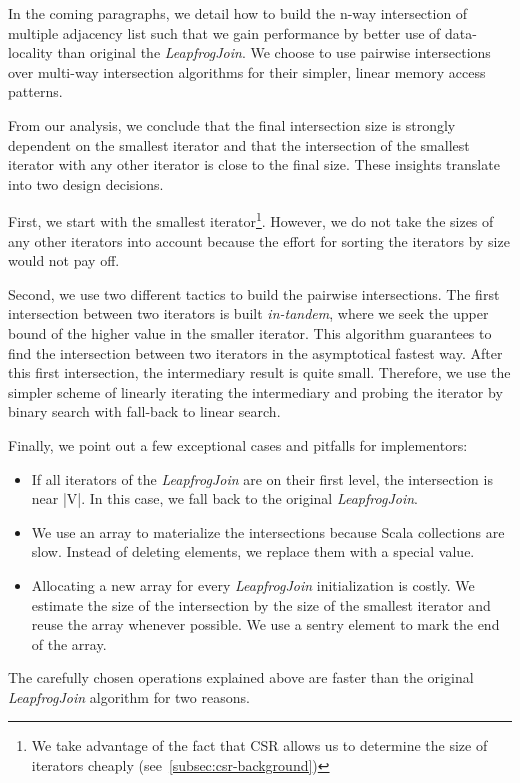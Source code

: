 In the coming paragraphs, we detail how to build the n-way intersection of multiple adjacency list
such that we gain performance by better use of data-locality than original the \textit{LeapfrogJoin}.
We choose to use pairwise intersections over multi-way intersection algorithms for their simpler,
linear memory access patterns.

From our analysis, we conclude that the final intersection size is strongly dependent on the
smallest iterator and that the intersection of the smallest iterator with any other iterator is
close to the final size.
These insights translate into two design decisions.

First, we start with the smallest iterator\footnote{We take advantage of the fact that CSR allows us
to determine the size of iterators cheaply (see~\cref{subsec:csr-background})}.
However, we do not take the sizes of any other iterators into account because the effort for
sorting the iterators by size would not pay off.

Second, we use two different tactics to build the pairwise intersections.
The first intersection between two iterators is built \textit{in-tandem},  where we seek
the upper bound of the higher value in the smaller iterator.
This algorithm guarantees to find the intersection between two iterators in the asymptotical fastest
way.
After this first intersection, the intermediary result is quite small.
Therefore, we use the simpler scheme of linearly iterating the intermediary and probing
the iterator by binary search with fall-back to linear search.

Finally, we point out a few exceptional cases and pitfalls for implementors:
\begin{itemize}
\item If all iterators of the \textit{LeapfrogJoin} are on their first level, the intersection is near |V|. In this case, we fall back
to the original
\textit{LeapfrogJoin}.
\item We use an array to materialize the intersections because Scala collections are slow.
Instead of deleting elements, we replace them with a special value.
\item Allocating a new array for every \textit{LeapfrogJoin} initialization is costly.
We estimate the size of the intersection by the size of the smallest iterator and reuse the array whenever possible. We use a sentry element to mark the end of the array.
\end{itemize}

The carefully chosen operations explained above are faster than the original \textit{LeapfrogJoin}
algorithm for two reasons.

